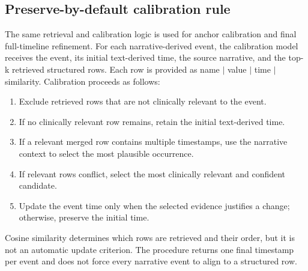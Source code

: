 \FloatBarrier
\subsection{Preserve-by-default calibration rule}\label{ch08:supp:calibration-rule}
\noindent The same retrieval and calibration logic is used for anchor calibration and final full-timeline refinement. For each narrative-derived event, the calibration model receives the event, its initial text-derived time, the source narrative, and the top-k retrieved structured rows. Each row is provided as name $\mid$ value $\mid$ time $\mid$ similarity. Calibration proceeds as follows:
\begin{enumerate}
    \item Exclude retrieved rows that are not clinically relevant to the event.
    \item If no clinically relevant row remains, retain the initial text-derived time.
    \item If a relevant merged row contains multiple timestamps, use the narrative context to select the most plausible occurrence.
    \item If relevant rows conflict, select the most clinically relevant and confident candidate.
    \item Update the event time only when the selected evidence justifies a change; otherwise, preserve the initial time.
\end{enumerate}
Cosine similarity determines which rows are retrieved and their order, but it is not an automatic update criterion.
The procedure returns one final timestamp per event and does not force every narrative event to align to a structured row.

